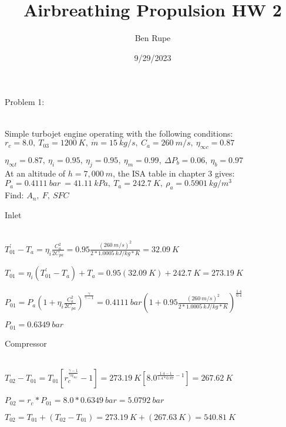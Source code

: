\documentclass{article}
\begin{document}
	\title{Airbreathing Propulsion HW 2}
\author{Ben Rupe}
\date{9/29/2023}
\maketitle

	\begin{LARGE}
		Problem 1:
	\end{LARGE}
\\

Simple turbojet engine operating with the following conditions:
\\

$r_c=8.0,\ T_{03}=1200\ K,\ \dot{m}=15\ kg/s,\ C_a=260\ m/s,\ \eta_{\infty c}=0.87$

$\eta_{\infty t}=0.87,\ \eta_i=0.95,\ \eta_j=0.95,\ \eta_m=0.99,\ \Delta P_b=0.06,\ \eta_b=0.97$
\\

At an altitude of $h=7,000\ m$, the ISA table in chapter 3 gives: 
\\

$P_a=0.4111\ bar\ =41.11\ kPa,\ T_a=242.7\ K,\ \rho_a=0.5901\ kg/m^{3}$
\\

Find: $A_n,\ F,\ SFC$
\\

	\begin{Large}
		Inlet
	\end{Large}
\\

$T_{01}^{'}-T_a=\eta_i \frac{C_a ^{2}}{2 C_{pa}} = 0.95 \frac{(260\ m/s) ^{2}}{2*1.0005\ kJ/kg*K} = 32.09\ K$

$T_{01}=\eta_i (T_{01}^{'}-T_a)+T_a = 0.95(32.09\ K)+242.7\ K = 273.19\ K$

$P_{01}=P_a (1+\eta_i \frac{C_a ^{2}}{2 C_{pa}})^{\frac{\gamma}{\gamma-1}} = 0.4111\ bar (1+0.95 \frac{(260\ m/s) ^{2}}{2*1.0005\ kJ/kg*K})^{\frac{1.4}{0.4}}$

$P_{01}=0.6349\ bar$
\\

	\begin{Large}
		Compressor
	\end{Large}
\\

$T_{02}-T_{01}=T_{01}[r_c ^{\frac{\gamma-1}{\gamma \eta_{\infty c}}}-1]=273.19\ K[8.0 ^{\frac{1.4-1}{1.4*0.87}-1}]=267.62\ K$

$P_{02}=r_c * P_{01}=8.0*0.6349\ bar=5.0792\ bar$

$T_{02}=T_{01}+(T_{02}-T_{01})=273.19\ K+(267.63\ K)=540.81\ K$
\\
\end{document}
